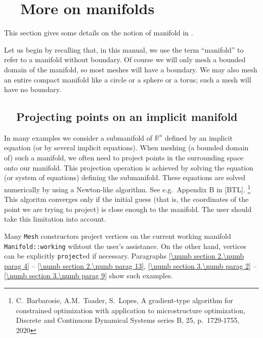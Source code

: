 
\chapter{~~More on manifolds}\label{\numb section 8}

This section gives some details on the notion of manifold in \maniFEM.

Let us begin by recalling that, in this manual, we use the term ``manifold'' to refer to
a manifold without boundary.
Of course we will only mesh a bounded domain of the manifold, so most meshes will have a boundary.
We may also mesh an entire compact manifold like a circle or a sphere or a torus;
such a mesh will have no boundary.


\section{~~Projecting points on an implicit manifold}\label{\numb section 8.\numb parag 1}

In many examples we consider a submanifold of $ \mathbb{R}^n $ defined by an implicit equation
(or by several implicit equations).
When meshing (a bounded domain of) such a manifold, we often need to project points in
the surrounding space onto our manifold. This projection operation is achieved by solving
the equation (or system of equations) defining the submanifold.
These equations are solved numerically by using a Newton-like algorithm.
See e.g.\ Appendix B in [BTL].%
\footnote{C.~Barbarosie, A.M.~Toader, S.~Lopes, A gradient-type algorithm for constrained
optimization with application to microstructure optimization, Discrete and Continuous Dynamical
Systems series B, 25, p.\ 1729-1755, 2020}
This algoritm converges only if the initial guess (that is, the coordinates of the point we are
trying to project) is close enough to the manifold.
The user should take this limitation into account.

Many {\small\tt Mesh} constructors project vertices on the current working manifold
{\small\tt Manifold::working} wihtout the user's assistance.
On the other hand, vertices can be explicitly {\small\tt project}ed if necessary.
Paragraphs \ref{\numb section 2.\numb parag 4} -- \ref{\numb section 2.\numb parag 13},
\ref{\numb section 3.\numb parag 2} -- \ref{\numb section 3.\numb parag 9} show such examples.
